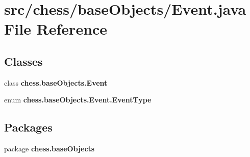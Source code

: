 \section{src/chess/base\+Objects/\+Event.java File Reference}
\label{_event_8java}
\subsection*{Classes}
\begin{DoxyCompactItemize}
\item 
class {\bf chess.\+base\+Objects.\+Event}
\item 
enum {\bfseries chess.\+base\+Objects.\+Event.\+Event\+Type}
\end{DoxyCompactItemize}
\subsection*{Packages}
\begin{DoxyCompactItemize}
\item 
package {\bf chess.\+base\+Objects}
\end{DoxyCompactItemize}
